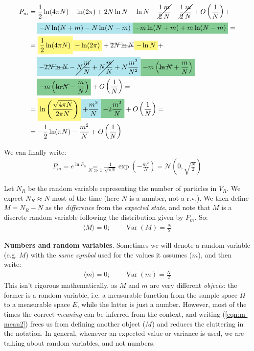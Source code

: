 \documentclass[../template.tex]{subfiles}
\begin{document}
\begin{align*}
P_m &= \frac{1}{2} \ln(4 \pi N) - \ln(2 \pi) + 2 N \ln N - \ln N -\cancel{\frac{1}{2} \frac{m}{N}} + \cancel{\frac{1}{2}\frac{m}{N} }+ O\left(\frac{1}{N} \right) +\\
&\quad \> \hlc{SkyBlue}{-N \ln (N+m) - N \ln(N-m)} \hlc{ForestGreen}{- m \ln(N+m) + m \ln(N-m)} =\\
&= \hlc{Yellow}{\frac{1}{2} \ln(4 \pi N)} \hlc{Yellow}{- \ln(2 \pi)} + \bcancel{2N \ln N} \hlc{Yellow}{- \ln N }+\\
&\quad \> \hlc{SkyBlue}{-\bcancel{2N \ln N} - \cancel{N \frac{m}{N}} + \cancel{N \frac{m}{N}} + N \frac{m^2}{N^2}} \hlc{ForestGreen}{- m\left(\cancel{\ln N} + \frac{m}{N} \right)} \\
&\quad \> \hlc{ForestGreen}{- m\left(\cancel{\ln N} - \frac{m}{N} \right) }+ O\left(\frac{1}{N} \right) =\\
&= \hlc{Yellow}{\ln \left(\frac{\sqrt{4 \pi N}}{2 \pi N} \right) }\hlc{SkyBlue}{+  \frac{m^2}{N} }\hlc{ForestGreen}{-2\frac{m^2}{N}} + O\left(\frac{1}{N} \right) =\\
&= - \frac{1}{2} \ln (\pi N) - \frac{m^2}{N} + O\left(\frac{1}{N} \right)  
\end{align*}

We can finally write:
\begin{align}\label{eqn:m-gaussian}
    P_m = e^{\ln P_n} \underset{N \gg 1}{=}  \frac{1}{\sqrt{\pi N}} \exp\left(-\frac{m^2}{N} \right) = \mathcal{N}\left(0, \sqrt{\frac{N}{2} }\right)
\end{align}

Let $N_R$ be the random variable representing the number of particles in $V_R$. We expect $N_R \approx N$ most of the time (here $N$ is a number, not a r.v.). We then define $M = N_R - N$ as the \textit{difference} from the \textit{expected state}, and note that $M$ is a discrete random variable following the distribution given by $P_m$. So:
\begin{align}
    \langle M \rangle = 0; \qquad \operatorname{Var}(M) = \frac{N}{2} \label{eqn:m-mean}
\end{align} 

\begin{appr}
    \textbf{Numbers and random variables}. Sometimes we will denote a random variable (e.g. $M$) with the \textit{same symbol} used for the values it assumes ($m$), and then write:
    \begin{align} \label{eqn:m-mean2}
        \langle m \rangle = 0; \qquad \operatorname{Var}(m) = \frac{N}{2}  
    \end{align} 
    This isn't rigorous mathematically, as $M$ and $m$ are very different \textit{objects}: the former is a random variable, i.e. a measurable function from the sample space $\Omega$ to a measurable space $E$, while the latter is just a number. However, most of the times the correct \textit{meaning} can be inferred from the context, and writing (\ref{eqn:m-mean2}) frees us from defining another object ($M$) and reduces the cluttering in the notation. In general, whenever an expected value or variance is used, we are talking about random variables, and not numbers.
\end{appr}
\end{document}
